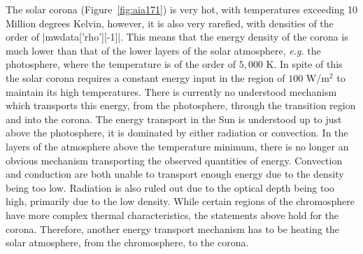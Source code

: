 The solar corona (Figure~\ref{fig:aia171}) is very hot, with temperatures exceeding 10 Million degrees Kelvin, however, it is also very rarefied, with densities of the order of \py[chapter1]|mwdata['rho'][-1]|.
This means that the energy density of the corona is much lower than that of the lower layers of the solar atmosphere, \textit{e.g.} the photosphere, where the temperature is of the order of $5,000$ K.
In spite of this the solar corona requires a constant energy input in the region of $100$ W/m$^2$ to maintain its high temperatures.
There is currently no understood mechanism which transports this energy, from the photosphere, through the transition region and into the corona.
The energy transport in the Sun is understood up to just above the photosphere, it is dominated by either radiation or convection.
In the layers of the atmosphere above the temperature minimum, there is no longer an obvious mechanism transporting the observed quantities of energy.
Convection and conduction are both unable to transport enough energy due to the density being too low.
Radiation is also ruled out due to the optical depth being too high, primarily due to the low density.
While certain regions of the chromosphere have more complex thermal characteristics, the statements above hold for the corona.
Therefore, another energy transport mechanism has to be heating the solar atmosphere, from the chromosphere, to the corona.



